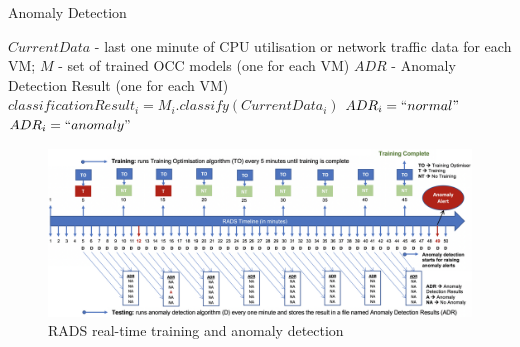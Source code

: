 \begin{algorithm}
\caption{Anomaly Detection}
\label{raids_algorithm_intrusion_detection}
\algnewcommand{}
\algnewcommand{}
\algnewcommand{}
\algnewcommand\INPUT{\item[\algorithmicinput]}
\algnewcommand\OUTPUT{\item[\algorithmicoutput]}
\algnewcommand\ABB{\item[\algorithmicabb]}

\begin{algorithmic}[1]
\INPUT $CurrentData$ - last one minute of CPU utilisation or network traffic data for each VM; $M$ - set of trained OCC models (one for each VM)
 \OUTPUT $ADR$ - Anomaly Detection Result (one for each VM)
\Statex
{}
\State $classificationResult_i=M_i.classify(CurrentData_i)$
\State $ADR_i= ``normal"$
\Else %
\State $ADR_i= ``anomaly"$
\EndIf
\EndFor
\end{algorithmic}
\end{algorithm}

\begin{figure}
  \centering
     \includegraphics[width=1\textwidth]{figures/RADS_Timeline}
   \caption{RADS  real-time training and anomaly detection}
  \label{fig:timeline}
\end{figure}

